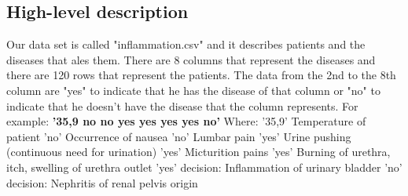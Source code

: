 \documentclass[a4paper,twoside,11pt]{article}
\begin{document}
\subsection{High-level description}
Our data set is called "inflammation.csv" and it describes patients and the diseases that ales them. There are 8 columns that represent the diseases and there are 120 rows that represent the patients. The data from the 2nd to the 8th column are "yes" to indicate that he has the disease of that column or "no" to indicate that he doesn't have the disease that the column represents. For example: \newline
\textbf{'35,9 no no yes yes yes yes no'} \newline
Where: \newline
'35,9' Temperature of patient \newline
'no' Occurrence of nausea \newline
'no' Lumbar pain \newline
'yes' Urine pushing (continuous need for urination) \newline
'yes' Micturition pains \newline
'yes' Burning of urethra, itch, swelling of urethra outlet \newline
'yes' decision: Inflammation of urinary bladder \newline
'no' decision: Nephritis of renal pelvis origin  \newline
\end{document}
